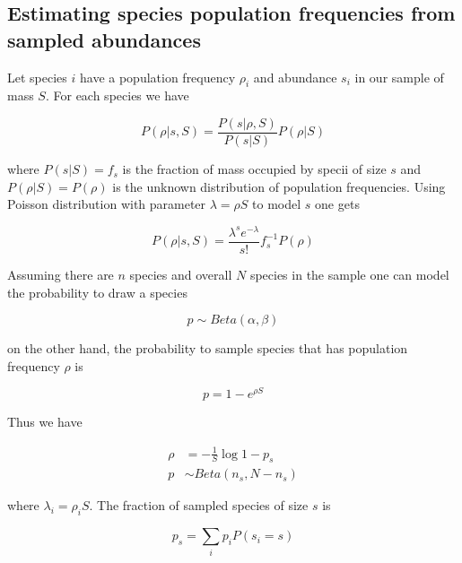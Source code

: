 \documentclass[12pt]{article}
\begin{document}
\subsection{Estimating species population frequencies from sampled abundances}

Let species $i$ have a population frequency $\rho_i$ and abundance $s_i$ in our sample of mass $S$. For each species we have

\begin{equation}
P(\rho|s, S) = \frac{P(s|\rho, S)}{P(s|S)}P(\rho|S)
\end{equation}

where $P(s|S)=f_s$ is the fraction of mass occupied by specii of size $s$ and $P(\rho|S) = P(\rho)$ is the unknown distribution of population frequencies. Using Poisson distribution with parameter $\lambda=\rho S$ to model $s$ one gets

\begin{equation}
P(\rho|s, S) = \frac{\lambda^s e^{-\lambda}}{s!}f_s^{-1}P(\rho)
\end{equation}

Assuming there are $n$ species and overall $N$ species in the sample one can model the probability to draw a species

\begin{equation}
p \sim Beta(\alpha, \beta)
\end{equation}

on the other hand, the probability to sample species that has population frequency $\rho$ is

\begin{equation}
p = 1 - e^{\rho S}
\end{equation}

Thus we have

\begin{align}
\rho &= -\frac{1}{S} \log 1-p_s \\
p &\sim Beta(n_s, N - n_s)
\end{align}

where $\lambda_i = \rho_i S$. The fraction of sampled species of size $s$ is

\begin{equation}
p_s = \sum_i p_i P(s_i = s)
\end{equation}
\end{document}
